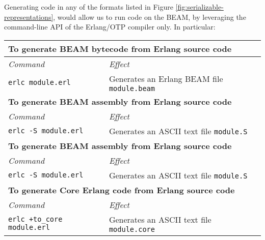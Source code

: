 Generating code in any of the formats listed in Figure
\ref{fig:serializable-representations}, would allow us to run code on
the BEAM, by leveraging the command-line API of the Erlang/OTP
compiler only. In particular:

\begin{table}[h]

\centering

\renewcommand*{\arraystretch}{1.5}

\begin{tabular}{|l|l|}
\hline%
\multicolumn{2}{|l|}{%
  \textbf{To generate BEAM bytecode from Erlang source code}%
}\\\hline%
\emph{Command} & \emph{Effect} \\\hline
  \lstinline[]!erlc module.erl! &%
  Generates an Erlang BEAM file \texttt{module.beam}
\\\hline%
\multicolumn{2}{|l|}{%
  \textbf{To generate BEAM assembly from Erlang source code}%
}\\\hline%
\emph{Command} & \emph{Effect} \\\hline
  \lstinline[]!erlc -S module.erl! &%
  Generates an ASCII text file \texttt{module.S}
\\\hline%
\multicolumn{2}{|l|}{%
  \textbf{To generate BEAM assembly from Erlang source code}%
}\\\hline%
\emph{Command} & \emph{Effect} \\\hline
  \lstinline[]!erlc -S module.erl! &%
  Generates an ASCII text file \texttt{module.S}
\\\hline%
\multicolumn{2}{|l|}{%
  \textbf{To generate Core Erlang code from Erlang source code}%
}\\\hline%
\emph{Command} & \emph{Effect} \\\hline
  \lstinline[]!erlc +to_core module.erl! &%
  Generates an ASCII text file \texttt{module.core}
\\\hline%
\end{tabular}

\end{table}

